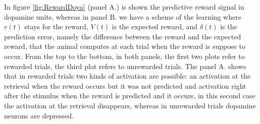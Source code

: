 In figure \ref{fig:RewardDoya} (panel A.) is shown the predictive reward signal in dopamine units, whereas in panel B. we have a scheme of the learning where $r(t)$ stays for the reward, $V(t)$ is the expected reward, and $\delta(t)$ is the prediction error, namely the difference between the reward and the expected reward, that the animal computes at each trial when the reward is suppose to occur. From the top to the bottom, in both panels, the first two plots refer to rewarded trials, the third plot refers to unrewarded trials. The panel A. shows that in rewarded trials two kinds of activation are possible: an activation at the retrieval when the reward occurs but it was not predicted and activation right after the stimulus when the reward is predicted and it occurs, in this second case the activation at the retrieval disappears, whereas in unrewarded trials dopamine neurons are depressed.

